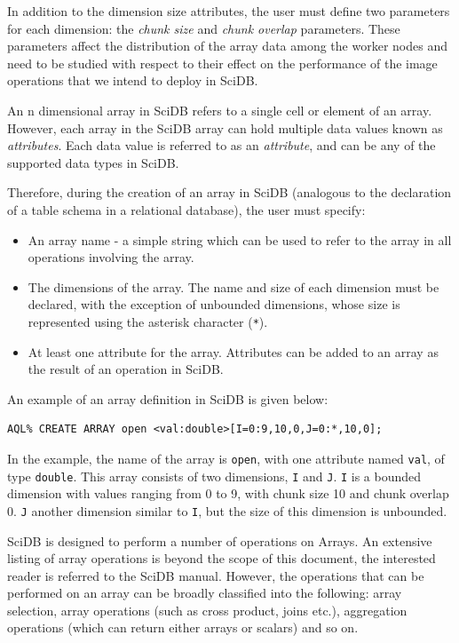 \documentclass[tog]{acmsiggraph}
\begin{document}
In addition to the dimension size attributes, the user must define two parameters for each dimension: the {\em chunk size} and {\em chunk overlap} parameters. These parameters affect the distribution of the array data among the worker nodes and need to be studied with respect to their effect on the performance of the image operations that we intend to deploy in SciDB.

An n dimensional array in SciDB refers to a single cell or element of an array. However, each array in the SciDB array can hold multiple data values known as {\em attributes}. Each data value is referred to as an {\em attribute}, and can be any of the supported data types in SciDB.

Therefore, during the creation of an array in SciDB (analogous to the declaration of a table schema in a relational database), the user must specify:

\begin{itemize}
\item An array name - a simple string which can be used to refer to the array in all operations involving the array.
\item The dimensions of the array. The name and size of each dimension must be declared, with the exception of unbounded dimensions, whose size is represented using the asterisk character (\texttt{*}).
\item At least one attribute for the array. Attributes can be added to an array as the result of an operation in SciDB.
\end{itemize}

An example of an array definition in SciDB is given below:

\begin{lstlisting}[caption=Creating an Array in SciDB, frame=single]
AQL% CREATE ARRAY open <val:double>[I=0:9,10,0,J=0:*,10,0];
\end{lstlisting}

In the example, the name of the array is \texttt{open}, with one attribute named \texttt{val}, of type \texttt{double}. This array consists of two dimensions, \texttt{I} and \texttt{J}. \texttt{I} is a bounded dimension with values ranging from 0 to 9, with chunk size 10 and chunk overlap 0. \texttt{J} another dimension similar to \texttt{I}, but the size of this dimension is unbounded.

SciDB is designed to perform a number of operations on Arrays. An extensive listing of array operations is beyond the scope of this document, the interested reader is referred to the SciDB manual\cite{SciDBManual}. However, the operations that can be performed on an array can be broadly classified into the following: array selection, array operations (such as cross product, joins etc.), aggregation operations (which can return either arrays or scalars) and so on.
\end{document}
